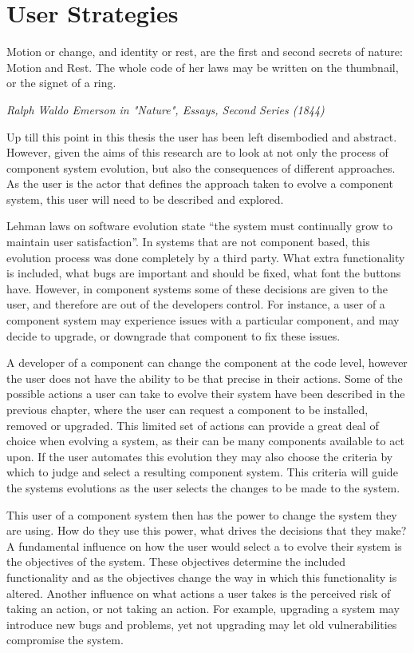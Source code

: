 \chapter{User Strategies}
\label{strategies}
\epigraph{Motion or change, and identity or rest, are the first and second secrets of nature: Motion and Rest. 
The whole code of her laws may be written on the thumbnail, or the signet of a ring.}
{\textit{Ralph Waldo Emerson in "Nature", Essays, Second Series (1844)}}

Up till this point in this thesis the user has been left disembodied and abstract.
However, given the aims of this research are to look at not only the process of component system evolution, but also the consequences of different approaches.
As the user is the actor that defines the approach taken to evolve a component system, this user will need to be described and explored.

Lehman laws on software evolution state ``the system must continually grow to maintain user satisfaction''.
In systems that are not component based, this evolution process was done completely by a third party.
What extra functionality is included, what bugs are important and should be fixed, what font the buttons have. 
However, in component systems some of these decisions are given to the user, and therefore are out of the developers control.
For instance, a user of a component system may experience issues with a particular component, 
and may decide to upgrade, or downgrade that component to fix these issues.

A developer of a component can change the component at the code level, however the user does not have the ability to be that precise in their actions.
Some of the possible actions a user can take to evolve their system have been described in the previous chapter,
where the user can request a component to be installed, removed or upgraded.
This limited set of actions can provide a great deal of choice when evolving a system, as their can be many components available to act upon.
If the user automates this evolution they may also choose the criteria by which to judge and select a resulting component system.
This criteria will guide the systems evolutions as the user selects the changes to be made to the system. 

This user of a component system then has the power to change the system they are using.
How do they use this power, what drives the decisions that they make?
A fundamental influence on how the user would select a to evolve their system is the objectives of the system.
These objectives determine the included functionality and as the objectives change the way in which this functionality is altered.  
Another influence on what actions a user takes is the perceived risk of taking an action, or not taking an action.
For example, upgrading a system may introduce new bugs and problems, yet not upgrading may let old vulnerabilities compromise the system.



